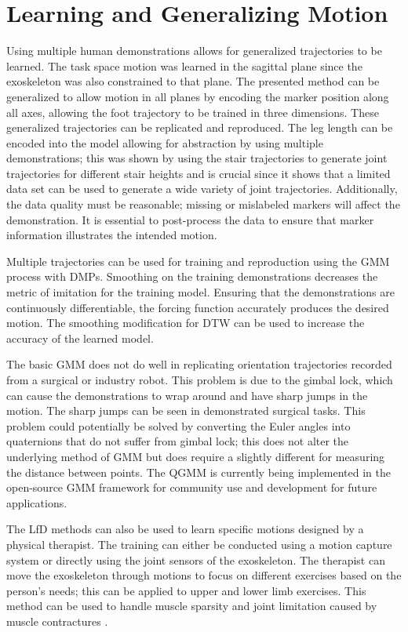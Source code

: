 \section{Learning and Generalizing Motion}


Using multiple human demonstrations allows for generalized trajectories to be learned. The task space motion was learned in the sagittal plane since the exoskeleton was also constrained to that plane. The presented method can be generalized to allow motion in all planes by encoding the marker position along all axes, allowing the foot trajectory to be trained in three dimensions. These generalized trajectories can be replicated and reproduced. The leg length can be encoded into the model allowing for abstraction by using multiple demonstrations;  this was shown by using the stair trajectories to generate joint trajectories for different stair heights and is crucial since it shows that a limited data set can be used to generate a wide variety of joint trajectories. Additionally, the data quality must be reasonable; missing or mislabeled markers will affect the demonstration. It is essential to post-process the data to ensure that marker information illustrates the intended motion. 

Multiple trajectories can be used for training and reproduction using the GMM process with DMPs. Smoothing on the training demonstrations decreases the metric of imitation for the training model. Ensuring that the demonstrations are continuously differentiable, the forcing function accurately produces the desired motion. The smoothing modification for DTW can be used to increase the accuracy of the learned model. 

The basic GMM does not do well in replicating orientation trajectories recorded from a surgical or industry robot. This problem is due to the gimbal lock, which can cause the demonstrations to wrap around and have sharp jumps in the motion. The sharp jumps can be seen in demonstrated surgical tasks. This problem could potentially be solved by converting the Euler angles into quaternions that do not suffer from gimbal lock; this does not alter the underlying method of GMM but does require a slightly different for measuring the distance between points. The QGMM is currently being implemented in the open-source GMM framework for community use and development for future applications. 

The LfD methods can also be used to learn specific motions designed by a physical therapist. The training can either be conducted using a motion capture system or directly using the joint sensors of the exoskeleton. The therapist can move the exoskeleton through motions to focus on different exercises based on the person's needs; this can be applied to upper and lower limb exercises. This method can be used to handle muscle sparsity and joint limitation caused by muscle contractures   \cite{hayes2014neuromuscular,james2001contractures}. 

